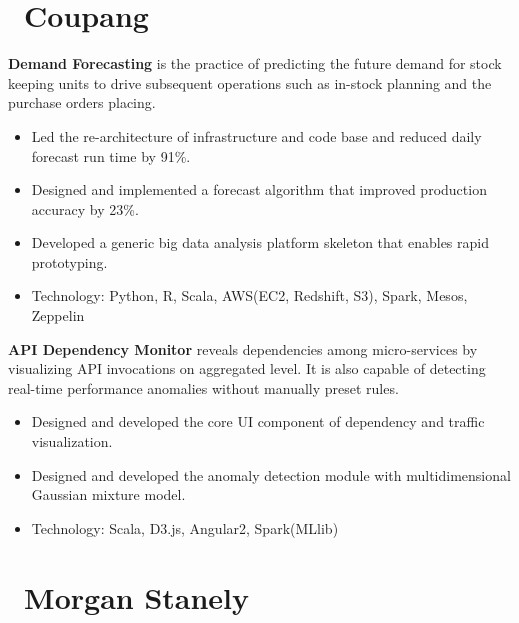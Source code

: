 \documentclass{resume}
\begin{document}





\section{\faUsers\ Coupang}
\textbf{Demand Forecasting} is the practice of predicting the future demand for stock keeping units to drive subsequent operations such as in-stock planning and the purchase orders placing.
\begin{itemize}
  \item Led the re-architecture of infrastructure and code base and reduced daily forecast run time by 91\%.
  \item Designed and implemented a forecast algorithm that improved production accuracy by 23\%.
  \item Developed a generic big data analysis platform skeleton that enables rapid prototyping.
  \item Technology: Python, R, Scala, AWS(EC2, Redshift, S3), Spark, Mesos, Zeppelin
\end{itemize}

\textbf{API Dependency Monitor} reveals dependencies among micro-services by visualizing API invocations on aggregated level. It is also capable of detecting real-time performance anomalies without manually preset rules.
\begin{itemize}
  \item Designed and developed the core UI component of dependency and traffic visualization.
  \item Designed and developed the anomaly detection module with multidimensional Gaussian mixture model.
  \item Technology: Scala, D3.js, Angular2, Spark(MLlib)
\end{itemize}


\section{\faUsers\ Morgan Stanely}
\smallskip
\end{document}
